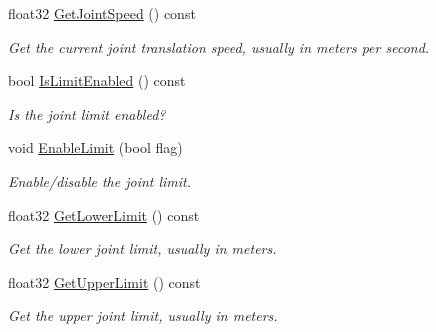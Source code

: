 \begin{DoxyCompactItemize}
\mbox{\label{classb2_prismatic_joint_af407d14ac024abdee49b852613f1bbc2}} 
float32 \hyperlink{classb2_prismatic_joint_af407d14ac024abdee49b852613f1bbc2}{Get\+Joint\+Speed} () const
\begin{DoxyCompactList}\small\item\em Get the current joint translation speed, usually in meters per second. \end{DoxyCompactList}\item 
\mbox{\label{classb2_prismatic_joint_a22e2442a17832f718447c63c9c6263c8}} 
bool \hyperlink{classb2_prismatic_joint_a22e2442a17832f718447c63c9c6263c8}{Is\+Limit\+Enabled} () const
\begin{DoxyCompactList}\small\item\em Is the joint limit enabled? \end{DoxyCompactList}\item 
\mbox{\label{classb2_prismatic_joint_a6d419afe7bd4b0e36d2e4607df7f79f2}} 
void \hyperlink{classb2_prismatic_joint_a6d419afe7bd4b0e36d2e4607df7f79f2}{Enable\+Limit} (bool flag)
\begin{DoxyCompactList}\small\item\em Enable/disable the joint limit. \end{DoxyCompactList}\item 
\mbox{\label{classb2_prismatic_joint_a10a2d3c03164190d279fa3c72eafb49e}} 
float32 \hyperlink{classb2_prismatic_joint_a10a2d3c03164190d279fa3c72eafb49e}{Get\+Lower\+Limit} () const
\begin{DoxyCompactList}\small\item\em Get the lower joint limit, usually in meters. \end{DoxyCompactList}\item 
\mbox{\label{classb2_prismatic_joint_aabae1da55e500b9c77007de4d085ffda}} 
float32 \hyperlink{classb2_prismatic_joint_aabae1da55e500b9c77007de4d085ffda}{Get\+Upper\+Limit} () const
\begin{DoxyCompactList}\small\item\em Get the upper joint limit, usually in meters. \end{DoxyCompactList}\item 

\end{DoxyCompactItemize}
